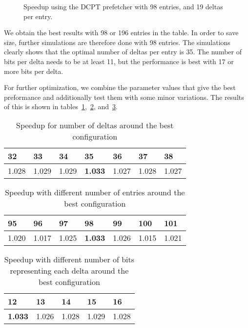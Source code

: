 \begin{figure}[h!]
	\begin{centering}
		
		\caption{Speedup using the DCPT prefetcher with 98 entries, and 19 deltas per entry.}
		\label{figure:dcpt-delta-bits}
	\end{centering}
\end{figure}

We obtain the best results with 98 or 196 entries in the table. In order to save
size, further simulations are therefore done with 98 entries. The simulations
 clearly shows that the optimal number of deltas per entry is 35. The
number of bits per delta needs to be at least 11, but the performance is best
with 17 or more bits per delta.

For further optimization, we combine the parameter values that give the best
preformance and additionally test them with some minor variations. The results
of this is shown in tables~\ref{tab:numdelta},~\ref{tab:tablesize},
and~\ref{tab:deltabits}.

\begin{table}[h!]
	\centering
	\begin{tabular}{|l|l|l|l|l|l|l|}
		\hline
		32	& 33	& 34	& \textbf{35}	& 36	& 37	& 38	\\
		\hline
		1.028 & 1.029 & 1.029 & \textbf{1.033} & 1.027 & 1.028 & 1.027 \\
		\hline
	\end{tabular}
	\smallskip
	\caption{Speedup for number of deltas around the best configuration}
	\label{tab:numdelta}
\end{table}

\begin{table}[h!]
	\centering
	\begin{tabular}{|l|l|l|l|l|l|l|}
		\hline
		95	& 96	& 97	& \textbf{98}	& 99	& 100	& 101	\\
		\hline
		1.020 & 1.017 & 1.025 & \textbf{1.033} & 1.026 & 1.015 & 1.021 \\
		\hline
	\end{tabular}
	\smallskip
	\caption{Speedup with different number of entries around the best configuration}
	\label{tab:tablesize}
\end{table}

\begin{table}[h!]
	\centering
	\begin{tabular}{|l|l|l|l|l|}
		\hline
		\textbf{12}	& 13	& 14	& 15	& 16	\\
		\hline
		\textbf{1.033} & 1.026 & 1.028 & 1.029 & 1.028 \\
		\hline
	\end{tabular}
	\smallskip
	\caption{Speedup with different number of bits representing each delta around the best configuration}
	\label{tab:deltabits}
\end{table}

